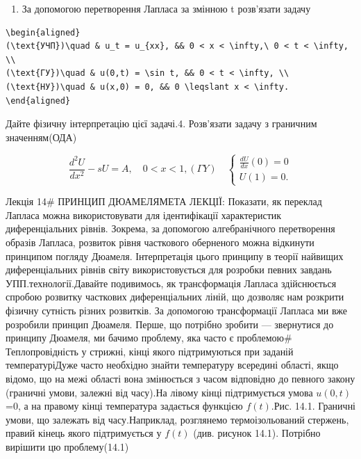 \documentclass[
  ukrainian,
]{article}
\providecommand{\tightlist}{%
  \setlength{\itemsep}{0pt}\setlength{\parskip}{0pt}}
\begin{document}
\begin{enumerate}
\def\labelenumi{\arabic{enumi}.}
\setcounter{enumi}{2}
\tightlist
\item
  За допомогою перетворення Лапласа за змінною t розв'язати задачу
\end{enumerate}

\begin{verbatim}
\begin{aligned}
(\text{УЧП})\quad & u_t = u_{xx}, && 0 < x < \infty,\ 0 < t < \infty, \\
(\text{ГУ})\quad & u(0,t) = \sin t, && 0 < t < \infty, \\
(\text{НУ})\quad & u(x,0) = 0, && 0 \leqslant x < \infty.
\end{aligned}
\end{verbatim}

Дайте фізичну інтерпретацію цієї задачі.4. Розв'язати задачу з граничним
значенням(ОДА)

\[
\frac{d^2U}{dx^2} - sU = A, \quad 0 < x < 1,
(\Gamma Y) \quad
\begin{cases} \frac{dU}{dx} (0) = 0 \\ U(1) = 0. \end{cases}
\]

Лекція 14\# ПРИНЦИП ДЮАМЕЛЯМЕТА ЛЕКЦІЇ: Показати, як переклад Лапласа
можна використовувати для ідентифікації характеристик диференціальних
рівнів. Зокрема, за допомогою алгебранічного перетворення образів
Лапласа, розвиток рівня часткового оберненого можна відкинути принципом
погляду Дюамеля. Інтерпретація цього принципу в теорії найвищих
диференціальних рівнів світу використовується для розробки певних
завдань УПП.технології.Давайте подивимось, як трансформація Лапласа
здійснюється спробою розвитку часткових диференціальних ліній, що
дозволяє нам розкрити фізичну сутність різних розвитків. За допомогою
трансформації Лапласа ми вже розробили принцип Дюамеля. Перше, що
потрібно зробити --- звернутися до принципу Дюамеля, ми бачимо проблему,
яка часто є проблемою\# Теплопровідність у стрижні, кінці якого
підтримуються при заданій температуріДуже часто необхідно знайти
температуру всередині області, якщо відомо, що на межі області вона
змінюється з часом відповідно до певного закону (граничні умови, залежні
від часу).На лівому кінці підтримується умова \(u(0,t)\)=0, а на правому
кінці температура задається функцією \(f(t)\).Рис. 14.1. Граничні умови,
що залежать від часу.Наприклад, розглянемо термоізольований стержень,
правий кінець якого підтримується у \(f(t)\) (див. рисунок 14.1).
Потрібно вирішити цю проблему(14.1)
\end{document}

